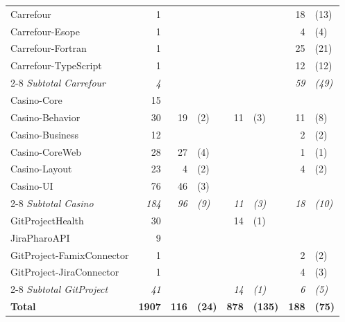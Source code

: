 \begin{tabular}{lrr@{ }lr@{ }lr@{ }l}
Carrefour & 1 &  &  &  &  & 18 & (13) \\
Carrefour-Esope & 1 &  &  &  &  & 4 & (4) \\
Carrefour-Fortran & 1 &  &  &  &  & 25 & (21) \\
Carrefour-TypeScript & 1 &  &  &  &  & 12 & (12) \\
\cmidrule(l){2-8}
\textit{Subtotal Carrefour} & \textit{4} &  &  &  &  & \textit{59} & \textit{(49)} \\[1ex]

Casino-Core & 15 &  &  &  &  &  &  \\
Casino-Behavior & 30 & 19 & (2) & 11 & (3) & 11 & (8) \\
Casino-Business & 12 &  &  &  &  & 2 & (2) \\
Casino-CoreWeb & 28 & 27 & (4) &  &  & 1 & (1) \\
Casino-Layout & 23 & 4 & (2) &  &  & 4 & (2) \\
Casino-UI & 76 & 46 & (3) &  &  &  &  \\
\cmidrule(l){2-8}
\textit{Subtotal Casino} & \textit{184} & \textit{96} & \textit{(9)} & \textit{11} & \textit{(3)} & \textit{18} & \textit{(10)} \\[1ex]

GitProjectHealth & 30 &  &  & 14 & (1) &  &  \\
JiraPharoAPI & 9 &  &  &  &  &  &  \\
GitProject-FamixConnector & 1 &  &  &  &  & 2 & (2) \\
GitProject-JiraConnector & 1 &  &  &  &  & 4 & (3) \\
\cmidrule(l){2-8}
\textit{Subtotal GitProject} & \textit{41} &  &  & \textit{14} & \textit{(1)} & \textit{6} & \textit{(5)} \\
\midrule
\textbf{Total} & \textbf{1907} & \textbf{116} & \textbf{(24)} & \textbf{878} & \textbf{(135)} & \textbf{188} & \textbf{(75)} \\
\bottomrule
\end{tabular}
